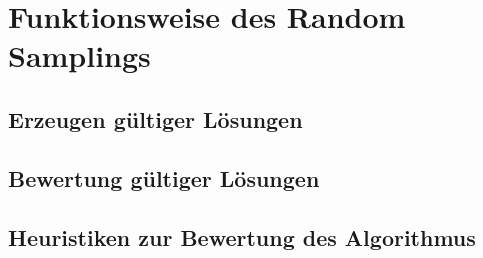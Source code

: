 \chapter{Funktionsweise des Random Samplings}

\section{Erzeugen gültiger Lösungen}

\section{Bewertung gültiger Lösungen}

\section{Heuristiken zur Bewertung des Algorithmus}